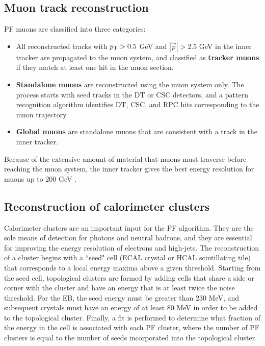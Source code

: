 \subsection{Muon track reconstruction}
\label{sec:muonTrackReco}
PF muons are classified into three categories:
\begin{itemize}
\item All reconstructed tracks with $p_{\mathrm{T}} > 0.5$ GeV and $|\vec{p}| > 2.5$ GeV in the inner tracker are propagated to the muon system, and classified as \textbf{tracker muons} if they match at least one hit in the muon section. 
\item \textbf{Standalone muons} are reconstructed using the muon system only. The process starts with seed tracks in the DT or CSC detectors, and a pattern recognition algorithm identifies DT, CSC, and RPC hits corresponding to the muon trajectory.
\item \textbf{Global muons} are standalone muons that are consistent with a track in the inner tracker. 
\end{itemize}

Because of the extensive amount of material that muons must traverse before reaching the muon system, the inner tracker gives the best energy resolution for muons up to 200 GeV \cite{ParticleFlow}.

\subsection{Reconstruction of calorimeter clusters}
\label{sec:clusterReco}
Calorimeter clusters are an important input for the PF algorithm. They are the sole means of detection for photons and neutral hadrons, and they are essential for improving the energy resolution of electrons and high-\pt jets. The reconstruction of a cluster begins with a ``seed" cell (ECAL crystal or HCAL scintillating tile) that corresponds to a local energy maxima above a given threshold. Starting from the seed cell, topological clusters are formed by adding cells that share a side or corner with the cluster and have an energy that is at least twice the noise threshold. For the EB, the seed energy must be greater than 230 MeV, and subsequent crystals must have an energy of at least 80 MeV in order to be added to the topological cluster. Finally, a fit is performed to determine what fraction of the energy in the cell is associated with each PF cluster, where the number of PF clusters is equal to the number of seeds incorporated into the topological cluster.

